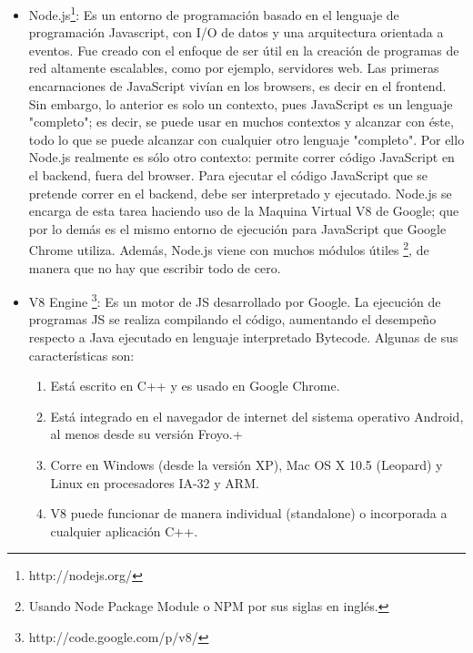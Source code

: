 \begin{itemize}
  \item Node.js\footnote{http://nodejs.org/}: Es un entorno de programación basado en el lenguaje de 
    programación Javascript, con I/O de datos y una arquitectura orientada a eventos. Fue creado con el 
    enfoque de ser útil en la creación de programas de red altamente escalables, como por ejemplo, servidores 
    web. Las primeras encarnaciones de JavaScript vivían en los browsers, es decir en el frontend. Sin embargo, 
    lo anterior es solo un contexto, pues JavaScript es un lenguaje "completo"; es decir, se puede  usar en muchos 
    contextos y alcanzar con éste, todo lo que se puede alcanzar con cualquier otro lenguaje "completo".
    Por ello Node.js realmente es sólo otro contexto: permite correr código JavaScript en el backend, fuera del 
    browser. Para ejecutar el código JavaScript que se pretende correr en el backend, debe ser interpretado y 
    ejecutado. Node.js se encarga de esta tarea haciendo uso de la Maquina Virtual V8 de Google; que por lo demás 
    es el mismo entorno de ejecución para JavaScript que Google Chrome utiliza. Además, Node.js viene con muchos 
    módulos útiles \footnote{Usando Node Package Module o NPM por sus siglas en inglés.}, de manera que no hay 
    que escribir todo de cero.

 \item V8 Engine \footnote{http://code.google.com/p/v8/}: Es un motor de JS desarrollado por Google. La 
 ejecución de programas JS se realiza compilando el código, aumentando el desempeño respecto a Java ejecutado en 
 lenguaje  interpretado Bytecode. Algunas de sus características son:
 \begin{enumerate}
  \item Está escrito en C++ y es usado en Google Chrome.
  \item Está integrado en el navegador de internet del sistema operativo Android, al
	menos desde su versión Froyo.+
  \item Corre en Windows (desde la versión XP), Mac OS X 10.5 (Leopard) y Linux en procesadores 
	IA-32 y ARM.
  \item V8 puede funcionar de manera individual (standalone) o incorporada a cualquier aplicación 
	C++.
 \end{enumerate}


\end{itemize}
